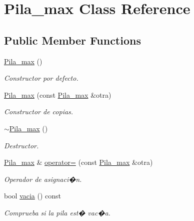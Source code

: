 \hypertarget{classPila__max}{}\section{Pila\+\_\+max Class Reference}
\label{classPila__max}
\subsection*{Public Member Functions}
\begin{DoxyCompactItemize}
\item 
\mbox{\label{classPila__max_ae615cbe816ccc0db7c08502ac5199f8f}} 
\mbox{\hyperlink{classPila__max_ae615cbe816ccc0db7c08502ac5199f8f}{Pila\+\_\+max}} ()
\begin{DoxyCompactList}\small\item\em Constructor por defecto. \end{DoxyCompactList}\item 
\mbox{\hyperlink{classPila__max_af032bf81c77d84275bf2d7bf27a333e5}{Pila\+\_\+max}} (const \mbox{\hyperlink{classPila__max}{Pila\+\_\+max}} \&otra)
\begin{DoxyCompactList}\small\item\em Constructor de copias. \end{DoxyCompactList}\item 
\mbox{\label{classPila__max_a3fce223a88d6dfb8430ec9a6c331b232}} 
\mbox{\hyperlink{classPila__max_a3fce223a88d6dfb8430ec9a6c331b232}{$\sim$\+Pila\+\_\+max}} ()
\begin{DoxyCompactList}\small\item\em Destructor. \end{DoxyCompactList}\item 
\mbox{\hyperlink{classPila__max}{Pila\+\_\+max}} \& \mbox{\hyperlink{classPila__max_a237f46b25334bf66e0bce3e0196c8c09}{operator=}} (const \mbox{\hyperlink{classPila__max}{Pila\+\_\+max}} \&otra)
\begin{DoxyCompactList}\small\item\em Operador de asignaci�n. \end{DoxyCompactList}\item 
\mbox{\label{classPila__max_a4b5784d89db4908b84a4ece46bc179fb}} 
bool \mbox{\hyperlink{classPila__max_a4b5784d89db4908b84a4ece46bc179fb}{vacia}} () const
\begin{DoxyCompactList}\small\item\em Comprueba si la pila est� vac�a. \end{DoxyCompactList}\item 

\end{DoxyCompactItemize}
